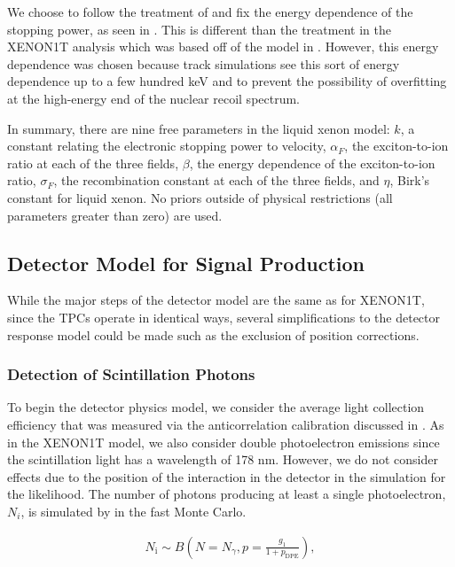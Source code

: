 We choose to follow the treatment of  and fix the energy dependence of the stopping power, as seen in .  This is different than the treatment in the XENON1T analysis which was based off of the model in .  However, this energy dependence was chosen because track simulations see this sort of energy dependence up to a few hundred keV and to prevent the possibility of overfitting at the high-energy end of the nuclear recoil spectrum.

In summary, there are nine free parameters in the liquid xenon model: $k$, a constant relating the electronic stopping power to velocity, $\alpha_F$, the exciton-to-ion ratio at each of the three fields, $\beta$, the energy dependence of the exciton-to-ion ratio, $\sigma_F$, the recombination constant at each of the three fields, and $\eta$, Birk's constant for liquid xenon.  No priors outside of physical restrictions (all parameters greater than zero) are used.



\subsection{Detector Model for Signal Production}

While the major steps of the detector model are the same as for XENON1T, since the TPCs operate in identical ways, several simplifications to the detector response model could be made such as the exclusion of position corrections.  


\subsubsection{Detection of Scintillation Photons}


To begin the detector physics model, we consider the average light collection efficiency that was measured via the anticorrelation calibration discussed in .  As in the XENON1T model, we also consider double photoelectron emissions \cite{faham2015measurements} since the scintillation light has a wavelength of 178 nm.  However, we do not consider effects due to the position of the interaction in the detector in the simulation for the likelihood.  The number of photons producing at least a single photoelectron, $N_i$, is simulated by  in the fast Monte Carlo.


\begin{equation}
        \label{eqn:nerix_binomial_lce}
        \begin{gathered}
                N_{\textrm{i}} \sim B \left( N = N_{\gamma}, p = \frac{g_1}{1 + p_{\textrm{DPE}}} \right), \\
        \end{gathered}
\end{equation}


